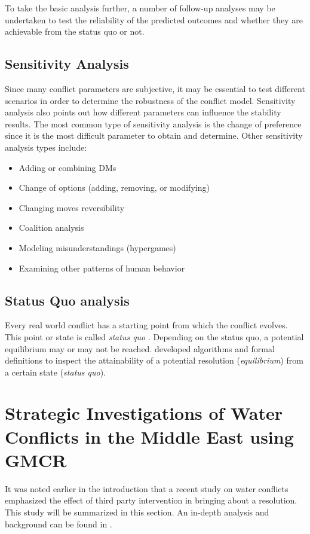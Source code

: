 \documentclass[letterpaper,12pt,titlepage,oneside,final]{book}
\begin{document}
To take the basic analysis further, a number of follow-up analyses may be undertaken to test the reliability of the predicted outcomes and whether they are achievable from the status quo or not.

\subsection{Sensitivity Analysis}

Since many conflict parameters are subjective, it may be essential to test different scenarios in order to determine the robustness of the conflict model. Sensitivity analysis also points out how different parameters can influence the stability results. The most common type of sensitivity analysis is the change of preference since it is the most difficult parameter to obtain and determine. Other sensitivity analysis types include:

\begin{itemize}
\item Adding or combining DMs
\item Change of options (adding, removing, or modifying) 
\item Changing moves reversibility
\item Coalition analysis
\item Modeling misunderstandings (hypergames)
\item Examining other patterns of human behavior
\end{itemize}


\subsection{Status Quo analysis}

Every real world conflict has a starting point from which the conflict evolves. This point or state is called \emph{status quo} \citep{fang1993}. Depending on the status quo, a potential equilibrium may or may not be reached. \citet{li2004squo,li2005squo} developed algorithms and formal definitions to inspect the attainability of a potential resolution (\emph{equilibrium}) from a certain state (\emph{status quo}).

\section{Strategic Investigations of Water Conflicts in the Middle East using GMCR}
\label{sec:example1}
It was noted earlier in the introduction that a recent study on water conflicts emphasized the effect of third party intervention in bringing about a resolution. This study will be summarized in this section. An in-depth analysis and background can be found in \citet{HipelRami}.
\end{document}
